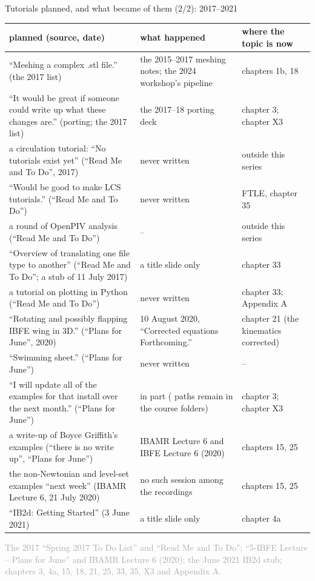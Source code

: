 \documentclass[aspectratio=169,11pt]{beamer}
\newcommand{\sourcecredit}[1]{\vfill\begin{flushright}\tiny\textcolor{DarkGray}{#1}\end{flushright}}
\begin{document}
\begin{frame}{Tutorials planned, and what became of them (2/2): 2017--2021}
\label{fr:planned2}
\tiny
\renewcommand{\arraystretch}{1.12}
\setlength{\tabcolsep}{3pt}
\begin{tabular}{@{}L{0.43\textwidth}L{0.27\textwidth}L{0.24\textwidth}@{}}
\toprule
planned (source, date) & what happened & where the topic is now \\
\midrule
``Meshing a complex .stl file.'' (the 2017 list) & the 2015--2017 meshing notes; the 2024 workshop's pipeline & chapters 1b, 18 \\
``It would be great if someone could write up what these changes are.'' (porting; the 2017 list) & the 2017--18 porting deck & chapter 3; chapter X3 \\
a circulation tutorial: ``No tutorials exist yet'' (``Read Me and To Do'', 2017) & never written & outside this series \\
``Would be good to make LCS tutorials.'' (``Read Me and To Do'') & never written & FTLE, chapter 35 \\
a round of OpenPIV analysis (``Read Me and To Do'') & -- & outside this series \\
``Overview of translating one file type to another'' (``Read Me and To Do''; a stub of 11 July 2017) & a title slide only & chapter 33 \\
a tutorial on plotting in Python (``Read Me and To Do'') & never written & chapter 33; Appendix A \\
``Rotating and possibly flapping IBFE wing in 3D.'' (``Plans for June'', 2020) & 10 August 2020, ``Corrected equations Forthcoming.'' & chapter 21 (the kinematics corrected) \\
``Swimming sheet.'' (``Plans for June'') & never written & -- \\
``I will update all of the examples for that install over the next month.'' (``Plans for June'') & in part ( paths remain in the course folders) & chapter 3; chapter X3 \\
a write-up of Boyce Griffith's examples (``there is no write up'', ``Plans for June'') & IBAMR Lecture 6 and IBFE Lecture 6 (2020) & chapters 15, 25 \\
the non-Newtonian and level-set examples ``next week'' (IBAMR Lecture 6, 21 July 2020) & no such session among the recordings & chapters 15, 25 \\
``IB2d: Getting Started'' (3 June 2021) & a title slide only & chapter 4a \\
\bottomrule
\end{tabular}
\sourcecredit{The 2017 ``Spring 2017 To Do List'' and ``Read Me and To Do''; ``5-IBFE Lecture -- Plans for June'' and IBAMR Lecture 6 (2020); the June 2021 IB2d stub; chapters 3, 4a, 15, 18, 21, 25, 33, 35, X3 and Appendix A.}
\end{frame}
\end{document}
